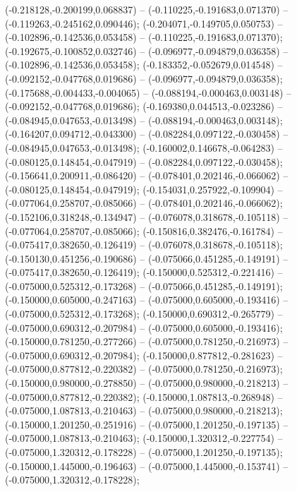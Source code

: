  (-0.218128,-0.200199,0.068837) -- (-0.110225,-0.191683,0.071370) -- (-0.119263,-0.245162,0.090446);
 (-0.204071,-0.149705,0.050753) -- (-0.102896,-0.142536,0.053458) -- (-0.110225,-0.191683,0.071370);
 (-0.192675,-0.100852,0.032746) -- (-0.096977,-0.094879,0.036358) -- (-0.102896,-0.142536,0.053458);
 (-0.183352,-0.052679,0.014548) -- (-0.092152,-0.047768,0.019686) -- (-0.096977,-0.094879,0.036358);
 (-0.175688,-0.004433,-0.004065) -- (-0.088194,-0.000463,0.003148) -- (-0.092152,-0.047768,0.019686);
 (-0.169380,0.044513,-0.023286) -- (-0.084945,0.047653,-0.013498) -- (-0.088194,-0.000463,0.003148);
 (-0.164207,0.094712,-0.043300) -- (-0.082284,0.097122,-0.030458) -- (-0.084945,0.047653,-0.013498);
 (-0.160002,0.146678,-0.064283) -- (-0.080125,0.148454,-0.047919) -- (-0.082284,0.097122,-0.030458);
 (-0.156641,0.200911,-0.086420) -- (-0.078401,0.202146,-0.066062) -- (-0.080125,0.148454,-0.047919);
 (-0.154031,0.257922,-0.109904) -- (-0.077064,0.258707,-0.085066) -- (-0.078401,0.202146,-0.066062);
 (-0.152106,0.318248,-0.134947) -- (-0.076078,0.318678,-0.105118) -- (-0.077064,0.258707,-0.085066);
 (-0.150816,0.382476,-0.161784) -- (-0.075417,0.382650,-0.126419) -- (-0.076078,0.318678,-0.105118);
 (-0.150130,0.451256,-0.190686) -- (-0.075066,0.451285,-0.149191) -- (-0.075417,0.382650,-0.126419);
 (-0.150000,0.525312,-0.221416) -- (-0.075000,0.525312,-0.173268) -- (-0.075066,0.451285,-0.149191);
 (-0.150000,0.605000,-0.247163) -- (-0.075000,0.605000,-0.193416) -- (-0.075000,0.525312,-0.173268);
 (-0.150000,0.690312,-0.265779) -- (-0.075000,0.690312,-0.207984) -- (-0.075000,0.605000,-0.193416);
 (-0.150000,0.781250,-0.277266) -- (-0.075000,0.781250,-0.216973) -- (-0.075000,0.690312,-0.207984);
 (-0.150000,0.877812,-0.281623) -- (-0.075000,0.877812,-0.220382) -- (-0.075000,0.781250,-0.216973);
 (-0.150000,0.980000,-0.278850) -- (-0.075000,0.980000,-0.218213) -- (-0.075000,0.877812,-0.220382);
 (-0.150000,1.087813,-0.268948) -- (-0.075000,1.087813,-0.210463) -- (-0.075000,0.980000,-0.218213);
 (-0.150000,1.201250,-0.251916) -- (-0.075000,1.201250,-0.197135) -- (-0.075000,1.087813,-0.210463);
 (-0.150000,1.320312,-0.227754) -- (-0.075000,1.320312,-0.178228) -- (-0.075000,1.201250,-0.197135);
 (-0.150000,1.445000,-0.196463) -- (-0.075000,1.445000,-0.153741) -- (-0.075000,1.320312,-0.178228);

